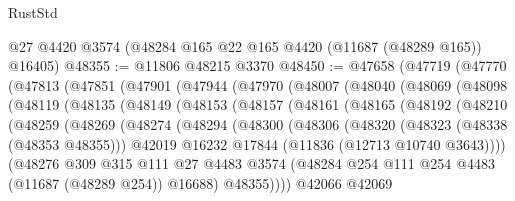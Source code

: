 \begin{lexlean}{RustStd}
\begin{coremodule}
    @27
    @4420
    @3574
    (@48284 @165 @22 @165 @4420 (@11687 (@48289 @165)) @16405)
@48355 := @11806 @48215 @3370
@48450 := @47658
    (@47719
      (@47770
        (@47813
          (@47851
            (@47901
              (@47944
                (@47970
                  (@48007
                    (@48040
                      (@48069
                        (@48098
                          (@48119
                            (@48135
                              (@48149
                                (@48153
                                  (@48157
                                    (@48161
                                      (@48165
                                        (@48192
                                          (@48210
                                            (@48259
                                              (@48269
                                                (@48274
                                                  (@48294
                                                    (@48300
                                                      (@48306
                                                        (@48320
                                                          (@48323 (@48338 (@48353 @48355)))
                                                          @42019
                                                          @16232
                                                          @17844
                                                          (@11836 (@12713 @10740 @3643))))
                                                      (@48276
                                                        @309
                                                        @315
                                                        @111
                                                        @27
                                                        @4483
                                                        @3574
                                                        (@48284
                                                          @254
                                                          @111
                                                          @254
                                                          @4483
                                                          (@11687 (@48289 @254))
                                                          @16688)
                                                        @48355))))
                                                @42066
                                                @42069

\end{coremodule}
\end{lexlean}
